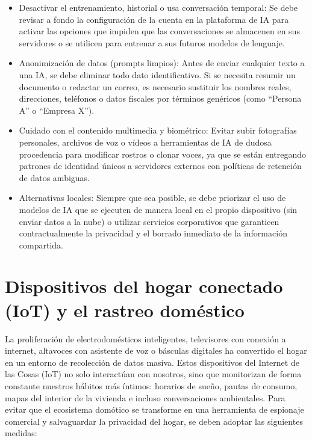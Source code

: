 \documentclass[
  spanish,
  a4paper,
  openany]{book}
\begin{document}
\begin{itemize}
\item
  Desactivar el entrenamiento, historial o usa conversación temporal: Se debe revisar a fondo la configuración de la cuenta en la plataforma de IA para activar las opciones que impiden que las conversaciones se almacenen en sus servidores o se utilicen para entrenar a sus futuros modelos de lenguaje.
\item
  Anonimización de datos (prompts limpios): Antes de enviar cualquier texto a una IA, se debe eliminar todo dato identificativo. Si se necesita resumir un documento o redactar un correo, es necesario sustituir los nombres reales, direcciones, teléfonos o datos fiscales por términos genéricos (como ``Persona A'' o ``Empresa X'').
\item
  Cuidado con el contenido multimedia y biométrico: Evitar subir fotografías personales, archivos de voz o vídeos a herramientas de IA de dudosa procedencia para modificar rostros o clonar voces, ya que se están entregando patrones de identidad únicos a servidores externos con políticas de retención de datos ambiguas.
\item
  Alternativas locales: Siempre que sea posible, se debe priorizar el uso de modelos de IA que se ejecuten de manera local en el propio dispositivo (sin enviar datos a la nube) o utilizar servicios corporativos que garanticen contractualmente la privacidad y el borrado inmediato de la información compartida.
\end{itemize}

\section{Dispositivos del hogar conectado (IoT) y el rastreo doméstico}\label{dispositivos-del-hogar-conectado-iot-y-el-rastreo-domuxe9stico}

La proliferación de electrodomésticos inteligentes, televisores con conexión a internet, altavoces con asistente de voz o básculas digitales ha convertido el hogar en un entorno de recolección de datos masiva. Estos dispositivos del Internet de las Cosas (IoT) no solo interactúan con nosotros, sino que monitorizan de forma constante nuestros hábitos más íntimos: horarios de sueño, pautas de consumo, mapas del interior de la vivienda e incluso conversaciones ambientales. Para evitar que el ecosistema domótico se transforme en una herramienta de espionaje comercial y salvaguardar la privacidad del hogar, se deben adoptar las siguientes medidas:
\end{document}
